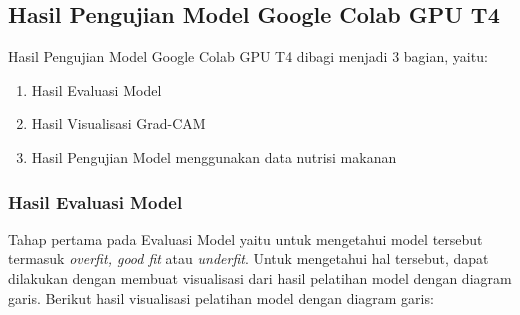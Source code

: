 \subsection{Hasil Pengujian Model Google Colab GPU T4}
Hasil Pengujian Model Google Colab GPU T4 dibagi menjadi 3 bagian, yaitu:
\begin{enumerate}
    \item Hasil Evaluasi Model
    \item Hasil Visualisasi Grad-CAM
    \item Hasil Pengujian Model menggunakan data nutrisi makanan
\end{enumerate}

\subsubsection{Hasil Evaluasi Model}
Tahap pertama pada Evaluasi Model yaitu untuk mengetahui model tersebut termasuk \textit{overfit, good fit} atau \textit{underfit}. Untuk mengetahui hal tersebut, dapat dilakukan dengan membuat visualisasi dari hasil pelatihan model dengan diagram garis. Berikut hasil visualisasi pelatihan model dengan diagram garis:


